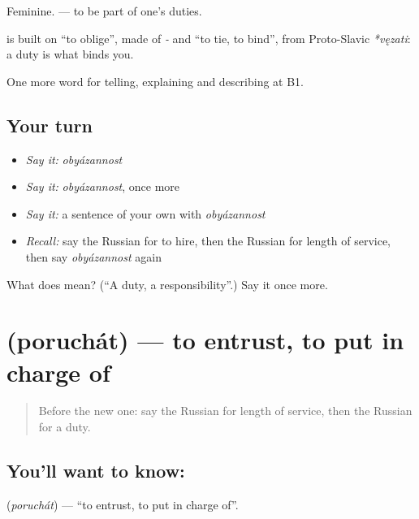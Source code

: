 Feminine. \emph{  } — to be part of one’s duties.

\begin{cousinweb}
\textbf{} is built on \emph{} \textquotedblleft{}to oblige\textquotedblright{}, made of \emph{-} and \emph{} \textquotedblleft{}to tie, to bind\textquotedblright{}, from Proto-Slavic \emph{*vęzati}: a duty is what binds you.
\end{cousinweb}

\begin{grammarlens}[title={What you've built}]
One more word for telling, explaining and describing at B1.
\end{grammarlens}

\subsection*{Your turn}
\begin{itemize}
\raggedright
  \item \emph{Say it:} \emph{obyázannost}
  \item \emph{Say it:} \emph{obyázannost}, once more
  \item \emph{Say it:} a sentence of your own with \emph{obyázannost}
  \item \emph{Recall:} say the Russian for to hire, then the Russian for length of service, then say \emph{obyázannost} again
\end{itemize}

\begin{tcolorbox}[breakable,colback=teal!4,colframe=teal!35!black,title={Before you move on}]
What does  mean? (\textquotedblleft{}A duty, a responsibility\textquotedblright{}.) Say it once more.
\end{tcolorbox}
\section[\texorpdfstring{\ru{поручать} (poruchát)}{поручать (poruchát)}]{ (poruchát) — to entrust, to put in charge of}

\label{lesson:RU-C359-poruchat}



\begin{quote}
Before the new one: say the Russian for length of service, then the Russian for a duty.
\end{quote}

\subsection*{You'll want to know: }
\textbf{} (\emph{poruchát}) — \textquotedblleft{}to entrust, to put in charge of\textquotedblright{}.


